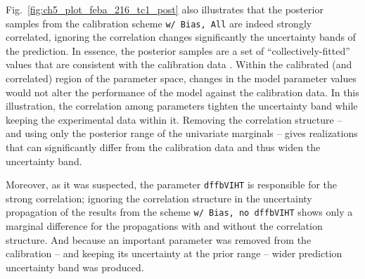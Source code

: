 Fig.~\ref{fig:ch5_plot_feba_216_tc1_post} also illustrates that the posterior samples from the calibration scheme \texttt{w/ Bias, All} are indeed strongly correlated, ignoring the correlation changes significantly the uncertainty bands of the prediction.
In essence, the posterior samples are a set of ``collect\-ively-fitted'' values that are consistent with the calibration data \cite{Gutenkunst2007} .
Within the calibrated (and correlated) region of the parameter space, changes in the model parameter values would not alter the performance of the model against the calibration data.
In this illustration, the correlation among parameters tighten the uncertainty band while keeping the experimental data within it.
Removing the correlation structure -- and using only the posterior range of the univariate marginals -- gives realizations that can significantly differ from the calibration data and thus widen the uncertainty band.

Moreover, as it was suspected, the parameter \texttt{dffbVIHT} is responsible for the strong correlation;
ignoring the correlation structure in the uncertainty propagation of the results from the scheme  \texttt{w/ Bias, no dffbVIHT} shows only a marginal difference for the propagations with and without the correlation structure.
And because an important parameter was removed from the calibration -- and keeping its uncertainty at the prior range -- wider prediction uncertainty band was produced.

